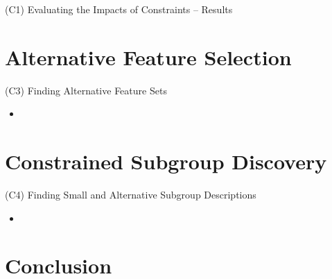 \documentclass[en, navbarinline, handout]{sdqbeamer}
\begin{document}
\begin{frame}[t]{(C1) Evaluating the Impacts of Constraints -- Results}
\begin{figure}[htb]
\begin{subfigure}{0.48\textwidth}
		\end{subfigure}
	\end{figure}
\end{frame}

\section{Alternative Feature Selection}

\begin{frame}[t]{(C3) Finding Alternative Feature Sets}
	\begin{itemize}
		\item
	\end{itemize}
\end{frame}

\section{Constrained Subgroup Discovery}

\begin{frame}[t]{(C4) Finding Small and Alternative Subgroup Descriptions}
	\begin{itemize}
		\item
	\end{itemize}
\end{frame}

\section{Conclusion}
\end{document}
